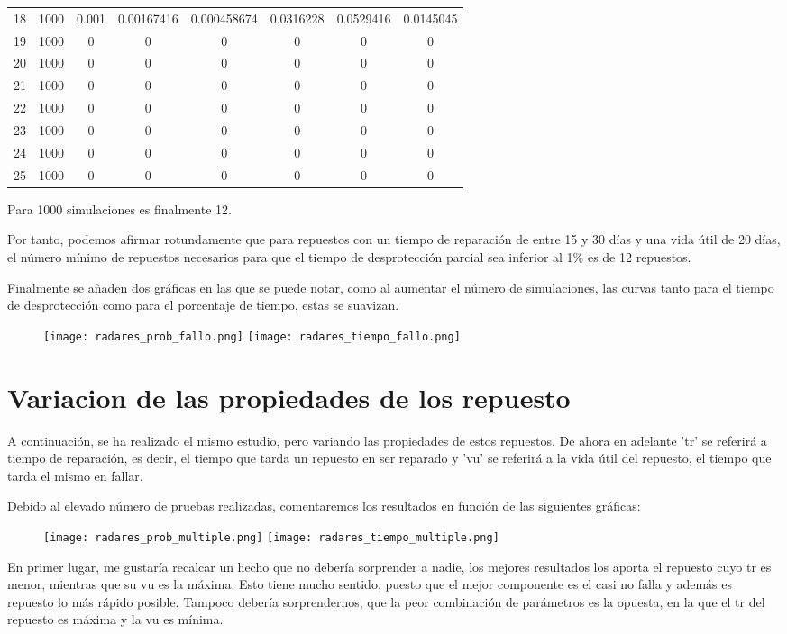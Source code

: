 \begin{table}[h]
{\begin{tabular}{|c|c|c|c|c|c|c|c|}
18 & 1000 & 0.001 & 0.00167416 & 0.000458674 & 0.0316228 & 0.0529416 & 0.0145045 \\
19 & 1000 & 0 & 0 & 0 & 0 & 0 & 0 \\
20 & 1000 & 0 & 0 & 0 & 0 & 0 & 0 \\
21 & 1000 & 0 & 0 & 0 & 0 & 0 & 0 \\
22 & 1000 & 0 & 0 & 0 & 0 & 0 & 0 \\
23 & 1000 & 0 & 0 & 0 & 0 & 0 & 0 \\
24 & 1000 & 0 & 0 & 0 & 0 & 0 & 0 \\
25 & 1000 & 0 & 0 & 0 & 0 & 0 & 0 \\ \hline
\end{tabular}%
}
\end{table}

Para 1000 simulaciones es finalmente 12.

Por tanto, podemos afirmar rotundamente que para repuestos con un tiempo de reparación de entre 15 y 30 días y una vida útil de 20 días, el número mínimo de repuestos necesarios para que el tiempo de desprotección parcial sea inferior al 1\% es de 12 repuestos.

Finalmente se añaden dos gráficas en las que se puede notar, como al aumentar el número de simulaciones, las curvas tanto para el tiempo de desprotección como para el porcentaje de tiempo, estas se suavizan.

\newpage


\begin{figure}[h]
\texttt{[image: radares\_prob\_fallo.png]}
\texttt{[image: radares\_tiempo\_fallo.png]}
\centering
\end{figure}

\newpage

\section{Variacion de las  propiedades de los repuesto}
A continuación, se ha realizado el mismo estudio, pero variando las propiedades de estos repuestos. De ahora en adelante 'tr' se referirá a tiempo de reparación, es decir, el tiempo que tarda un repuesto en ser reparado y 'vu' se referirá a la vida útil del repuesto, el tiempo que tarda el mismo en fallar.

Debido al elevado número de pruebas realizadas, comentaremos los resultados en función de las siguientes gráficas:

\begin{figure}[h]
\texttt{[image: radares\_prob\_multiple.png]}
\texttt{[image: radares\_tiempo\_multiple.png]}
\centering
\end{figure}
En primer lugar, me gustaría recalcar un hecho que no debería sorprender a nadie, los mejores resultados los aporta el repuesto cuyo tr es menor, mientras que su vu es la máxima. Esto tiene mucho sentido, puesto que el mejor componente es el casi no falla y además es repuesto lo más rápido posible. Tampoco debería sorprendernos, que la peor combinación de parámetros es la opuesta, en la que el tr del repuesto es máxima y la vu es mínima.

